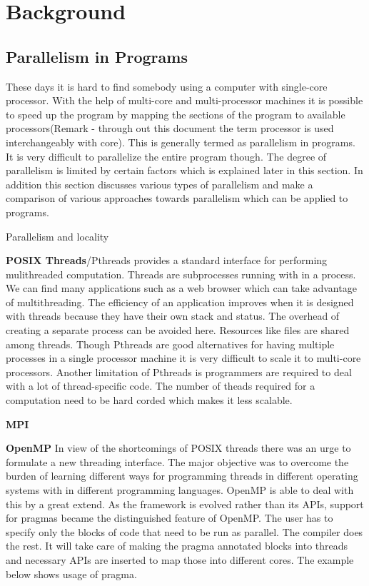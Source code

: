 \documentclass[a4paper,12pt]{book}
\begin{document}
\chapter{Background}

\section{Parallelism in Programs}
These days it is hard to find somebody using a computer with single-core processor.
With the help of multi-core and multi-processor machines it is possible to speed up 
the program by mapping the sections of the program to available processors(Remark - 
through out this document the term processor is used interchangeably with core). This 
is generally termed as parallelism in programs. It is very difficult to parallelize
the entire program though. The degree of parallelism is limited by certain factors which is
explained later in this section. In addition this section discusses various types of parallelism and
make a comparison of various approaches towards parallelism which can be applied to programs.

Parallelism and locality

\textbf{POSIX Threads}/Pthreads provides a standard interface for performing mulithreaded computation. 
Threads are subprocesses running with in a process. 
We can find many applications such as a web browser which can take advantage of multithreading.
The efficiency of an application improves when it is designed with threads because they have their
own stack and status. The overhead of creating a separate process can be avoided here.
Resources like files are shared among threads. Though Pthreads are good alternatives for
having multiple processes in a single processor machine it is very difficult to scale
it to multi-core processors. Another limitation of Pthreads is programmers are required to
deal with a lot of thread-specific code. The number of theads required for a computation
need to be hard corded which makes it less scalable.

\textbf{MPI}

\textbf{OpenMP}
In view of the shortcomings of POSIX threads there was an urge to formulate a new threading
interface. The major objective was to overcome the burden of learning different ways for programming threads in different
operating systems with in different programming languages. OpenMP is able to deal with this
by a great extend. As the framework is evolved rather than its APIs, support for pragmas became the distinguished
feature of OpenMP. The user has to specify only the blocks of code that need to be run
as parallel. The compiler does the rest. It will take care of making the pragma annotated blocks into
threads and necessary APIs are inserted to map those into different cores. The example below
shows usage of pragma.
\end{document}
